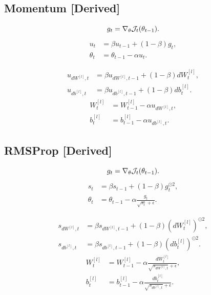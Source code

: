 \subsection{Momentum \textbf{[Derived]}}

\[
g_t = \nabla_{\theta}\mathcal{J}_t(\theta_{t-1}).
\]
\[
\begin{aligned}
u_t
&=
\beta u_{t-1}
+
(1-\beta)g_t,\\
\theta_t
&=
\theta_{t-1}
-
\alpha u_t.
\end{aligned}
\]

\[
\begin{aligned}
u_{dW^{[l]},t}
&=
\beta u_{dW^{[l]},t-1}
+
(1-\beta)dW^{[l]}_t,\\
u_{db^{[l]},t}
&=
\beta u_{db^{[l]},t-1}
+
(1-\beta)db^{[l]}_t.
\end{aligned}
\]
\[
\begin{aligned}
W^{[l]}_t
&=
W^{[l]}_{t-1}
-
\alpha u_{dW^{[l]},t},\\
b^{[l]}_t
&=
b^{[l]}_{t-1}
-
\alpha u_{db^{[l]},t}.
\end{aligned}
\]

\subsection{RMSProp \textbf{[Derived]}}

\[
g_t = \nabla_{\theta}\mathcal{J}_t(\theta_{t-1}).
\]
\[
\begin{aligned}
s_t
&=
\beta s_{t-1}
+
(1-\beta)g_t^{\odot 2},\\
\theta_t
&=
\theta_{t-1}
-
\alpha
\frac{g_t}{\sqrt{s_t}+\epsilon}.
\end{aligned}
\]

\[
\begin{aligned}
s_{dW^{[l]},t}
&=
\beta s_{dW^{[l]},t-1}
+
(1-\beta)(dW^{[l]}_t)^{\odot 2},\\
s_{db^{[l]},t}
&=
\beta s_{db^{[l]},t-1}
+
(1-\beta)(db^{[l]}_t)^{\odot 2}.
\end{aligned}
\]
\[
\begin{aligned}
W^{[l]}_t
&=
W^{[l]}_{t-1}
-
\alpha
\frac{dW^{[l]}_t}{\sqrt{s_{dW^{[l]},t}}+\epsilon},\\
b^{[l]}_t
&=
b^{[l]}_{t-1}
-
\alpha
\frac{db^{[l]}_t}{\sqrt{s_{db^{[l]},t}}+\epsilon}.
\end{aligned}
\]

